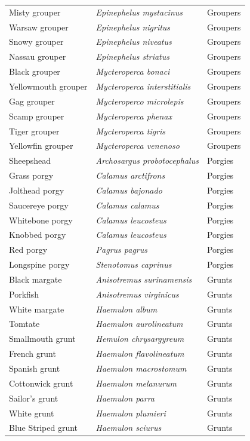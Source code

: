 \documentclass[
]{book}
\begin{document}
\begin{table}
\begin{tabular}[t]{l>{\em}ll}
\addlinespace
Misty grouper & Epinephelus mystacinus & Groupers\\
Warsaw grouper & Epinephelus nigritus & Groupers\\
Snowy grouper & Epinephelus niveatus & Groupers\\
Nassau grouper & Epinephelus striatus & Groupers\\
Black grouper & Mycteroperca bonaci & Groupers\\
\addlinespace
Yellowmouth grouper & Mycteroperca interstitialis & Groupers\\
Gag grouper & Mycteroperco microlepis & Groupers\\
Scamp grouper & Mycteroperca phenax & Groupers\\
Tiger grouper & Mycteroperca tigris & Groupers\\
Yellowfin grouper & Mycteroperca venenoso & Groupers\\
\addlinespace
Sheepshead & Archosargus probotocephalus & Porgies\\
Grass porgy & Calamus arctifrons & Porgies\\
Jolthead porgy & Calamus bajonado & Porgies\\
Saucereye porgy & Calamus calamus & Porgies\\
Whitebone porgy & Calamus leucosteus & Porgies\\
\addlinespace
Knobbed porgy & Calamus leucosteus & Porgies\\
Red porgy & Pagrus pagrus & Porgies\\
Longspine porgy & Stenotomus caprinus & Porgies\\
Black margate & Anisotremus surinamensis & Grunts\\
Porkfish & Anisotremus virginicus & Grunts\\
\addlinespace
White margate & Haemulon album & Grunts\\
Tomtate & Haemulon aurolineatum & Grunts\\
Smallmouth grunt & Hemulon chrysargyreum & Grunts\\
French grunt & Haemulon flavolineatum & Grunts\\
Spanish grunt & Haemulon macrostomum & Grunts\\
\addlinespace
Cottonwick grunt & Haemulon melanurum & Grunts\\
Sailor's grunt & Haemulon parra & Grunts\\
White grunt & Haemulon plumieri & Grunts\\
Blue Striped grunt & Haemulon sciurus & Grunts\\

\end{tabular}
\end{table}
\end{document}
